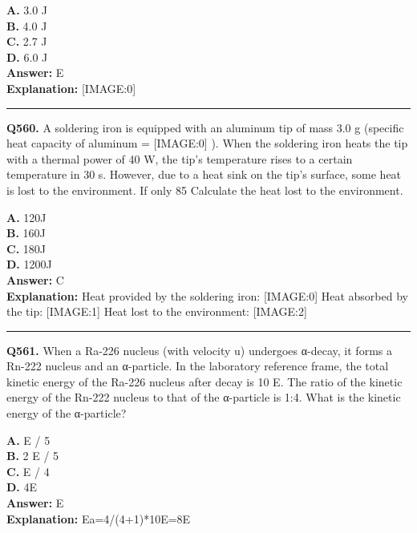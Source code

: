 \documentclass[12pt]{article}
\begin{document}
\textbf{A.} 3.0 J \\
\textbf{B.} 4.0 J \\
\textbf{C.} 2.7
J \\
\textbf{D.} 6.0 J \\

\textbf{Answer:} E \\
\textbf{Explanation:} [IMAGE:0]

\hrule
\vspace{1em}


\noindent
\textbf{Q560.} A soldering iron is equipped with an aluminum tip of mass 3.0 g (specific heat capacity of aluminum =
[IMAGE:0]
). When the soldering iron heats the tip with a thermal power of 40 W, the tip's temperature rises to a certain temperature in 30 s. However, due to a heat sink on the tip's surface, some heat is lost to the environment. If only 85%
Calculate the heat lost to the environment.



\textbf{A.} 120J \\
\textbf{B.} 160J \\
\textbf{C.} 180J \\
\textbf{D.} 1200J \\

\textbf{Answer:} C \\
\textbf{Explanation:} Heat provided by the soldering iron:
[IMAGE:0]
Heat absorbed by the tip:
[IMAGE:1]
Heat lost to the environment:
[IMAGE:2]

\hrule
\vspace{1em}


\noindent
\textbf{Q561.} When a Ra-226 nucleus (with velocity u) undergoes α-decay, it forms a Rn-222 nucleus and an α-particle. In the laboratory reference frame, the total kinetic energy of the Ra-226 nucleus after decay is
10
E. The ratio of the kinetic energy of the Rn-222 nucleus to that of the α-particle is 1:4. What is the kinetic energy of the α-particle?



\textbf{A.} E​
/
5 \\
\textbf{B.} 2
E​
/
5 \\
\textbf{C.} E​
/
4 \\
\textbf{D.} 4E​ \\

\textbf{Answer:} E \\
\textbf{Explanation:} Ea=4/(4+1)*10E=8E
\end{document}
